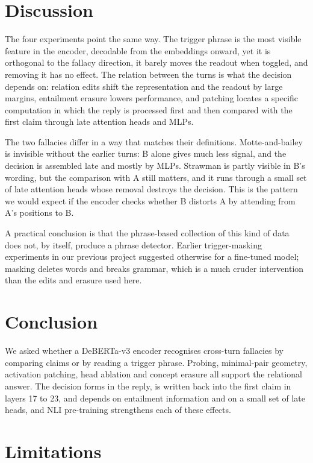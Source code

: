 \documentclass[11pt]{article}
\begin{document}
\section{Discussion}

The four experiments point the same way. The trigger phrase is the most visible feature in the encoder, decodable from the embeddings onward, yet it is orthogonal to the fallacy direction, it barely moves the readout when toggled, and removing it has no effect. The relation between the turns is what the decision depends on: relation edits shift the representation and the readout by large margins, entailment erasure lowers performance, and patching locates a specific computation in which the reply is processed first and then compared with the first claim through late attention heads and MLPs.

The two fallacies differ in a way that matches their definitions. Motte-and-bailey is invisible without the earlier turns: B alone gives much less signal, and the decision is assembled late and mostly by MLPs. Strawman is partly visible in B's wording, but the comparison with A still matters, and it runs through a small set of late attention heads whose removal destroys the decision. This is the pattern we would expect if the encoder checks whether B distorts A by attending from A's positions to B.

A practical conclusion is that the phrase-based collection of this kind of data does not, by itself, produce a phrase detector. Earlier trigger-masking experiments in our previous project suggested otherwise for a fine-tuned model; masking deletes words and breaks grammar, which is a much cruder intervention than the edits and erasure used here.

\section{Conclusion}

We asked whether a DeBERTa-v3 encoder recognises cross-turn fallacies by comparing claims or by reading a trigger phrase. Probing, minimal-pair geometry, activation patching, head ablation and concept erasure all support the relational answer. The decision forms in the reply, is written back into the first claim in layers 17 to 23, and depends on entailment information and on a small set of late heads, and NLI pre-training strengthens each of these effects.

\section*{Limitations}
\end{document}
